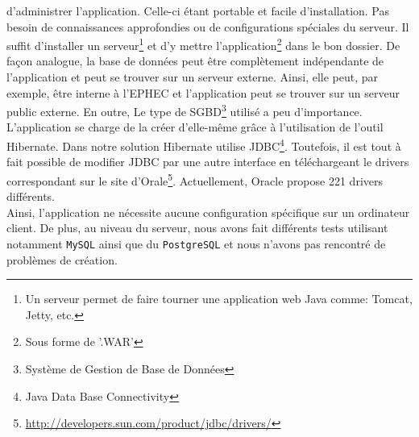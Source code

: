 d'administrer l'application. Celle-ci étant portable et facile d'installation.
Pas besoin de connaissances approfondies ou de configurations spéciales du
serveur. Il suffit d'installer un serveur\footnote{Un serveur permet
de faire tourner une application web Java comme: Tomcat, Jetty, etc.} et d'y
mettre l'application\footnote{Sous forme de '.WAR'} dans le bon dossier.
\newline
\indent
De façon analogue, la base de données peut être complètement indépendante de l'application et peut se trouver sur un serveur externe. Ainsi, elle peut, par exemple, être interne à l'EPHEC et l'application peut se trouver sur un serveur public externe. En outre, 
Le type de SGBD\footnote{Système de Gestion de Base de Données} utilisé a peu d'importance. L'application se charge de la créer d'elle-même
grâce à l'utilisation de l'outil Hibernate. Dans notre solution Hibernate utilise JDBC\footnote{Java Data Base Connectivity}.
\newline
\indent
Toutefois, il est tout à fait possible de modifier JDBC par une autre interface en téléchargeant le drivers correspondant sur le site d'Orale\footnote{\url{http://developers.sun.com/product/jdbc/drivers/}}. Actuellement, Oracle propose 221 drivers différents.\\
\newline
\indent
Ainsi, l'application ne nécessite aucune configuration spécifique sur un ordinateur client. De plus, au niveau du serveur, nous avons fait différents tests utilisant notamment \texttt{MySQL} ainsi que du \texttt{PostgreSQL} et nous n'avons pas rencontré de problèmes de création.

